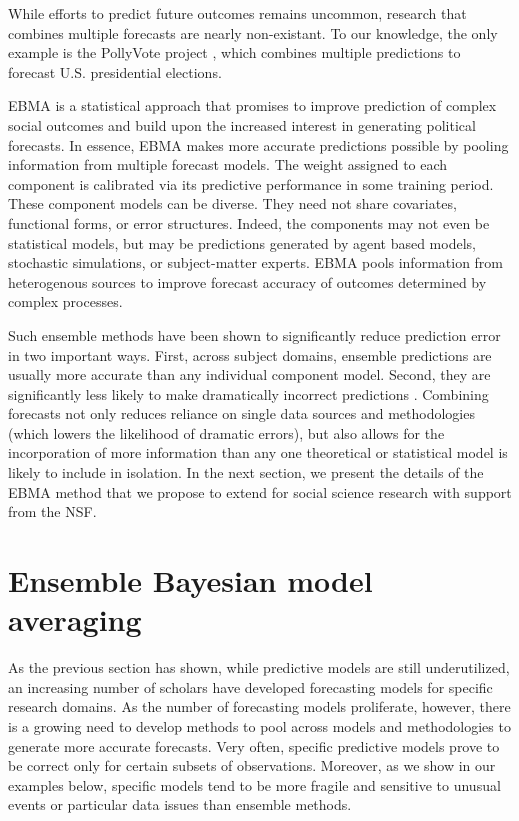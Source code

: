 \documentclass[pdftex,12pt,fullpage,oneside]{amsart}
\begin{document}
While efforts to predict future outcomes remains uncommon, research
that combines multiple forecasts are nearly non-existant.  To our
knowledge, the only example is the PollyVote project
\citep[c.f.][]{Graefe:2010}, which combines multiple predictions to
forecast U.S. presidential elections.

EBMA is a statistical approach that promises to improve prediction of
complex social outcomes and build upon the increased interest in
generating political forecasts.  In essence, EBMA makes more accurate
predictions possible by pooling information from multiple forecast
models. The weight assigned to each component is calibrated via its
predictive performance in some training period. These component models
can be diverse.  They need not share covariates, functional forms, or
error structures. Indeed, the components may not even be statistical
models, but may be predictions generated by agent based models,
stochastic simulations, or subject-matter experts. EBMA pools
information from heterogenous sources to improve forecast accuracy of
outcomes determined by complex processes.

Such ensemble methods have been shown to significantly reduce
prediction error in two important ways.  First, across subject
domains, ensemble predictions are usually more accurate than any
individual component model. Second, they are significantly less likely
to make dramatically incorrect predictions \citep{Armstrong:2001,
  Raftery:2005}.  Combining forecasts not only reduces reliance on
single data sources and methodologies (which lowers the likelihood of
dramatic errors), but also allows for the incorporation of more
information than any one theoretical or statistical model is likely to
include in isolation.  In the next section, we present the details of
the EBMA method that we propose to extend for social science research
with support from the NSF.


\setcounter{section}{1}

\section{Ensemble Bayesian model averaging} 

As the previous section has shown, while predictive models are still
underutilized, an increasing number of scholars have developed
forecasting models for specific research domains.  As the number of
forecasting models proliferate, however, there is a growing need to
develop methods to pool across models and methodologies to generate
more accurate forecasts.  Very often, specific predictive models prove
to be correct only for certain subsets of observations.  Moreover, as
we show in our examples below, specific models tend to be more
fragile and sensitive to unusual events or particular data issues than ensemble
methods.  
\end{document}
